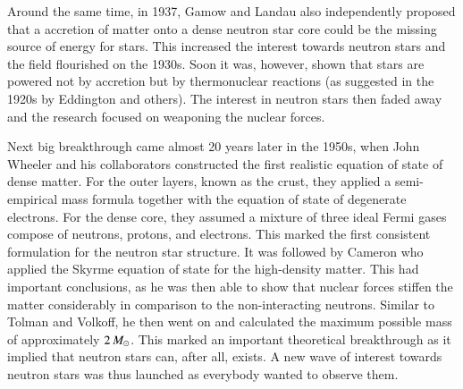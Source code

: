 Around the same time, in 1937, Gamow and Landau also independently proposed that a accretion of matter onto a dense neutron star core could be the missing source of energy for stars.
This increased the interest towards neutron stars and the field flourished on the 1930s.
Soon it was, however, shown that stars are powered not by accretion but by thermonuclear reactions (as suggested in the 1920s by Eddington and others).
The interest in neutron stars then faded away and the research focused on weaponing the nuclear forces.



Next big breakthrough came almost 20 years later in the 1950s, when John Wheeler and his collaborators constructed the first realistic equation of state of dense matter\cite{Wheeler66}.
For the outer layers, known as the crust, they applied a semi-empirical mass formula together with the equation of state of degenerate electrons.
For the dense core, they assumed a mixture of three ideal Fermi gases compose of neutrons, protons, and electrons.
This marked the first consistent formulation for the neutron star structure.
It was followed by Cameron who applied the Skyrme equation of state for the high-density matter.
This had important conclusions, as he was then able to show that nuclear forces stiffen the matter considerably in comparison to the non-interacting neutrons.
Similar to Tolman and Volkoff, he then went on and calculated the maximum possible mass of approximately $2\, M_{\odot}$.
This marked an important theoretical breakthrough as it implied that neutron stars can, after all, exists.
A new wave of interest towards neutron stars was thus launched as everybody wanted to observe them.


